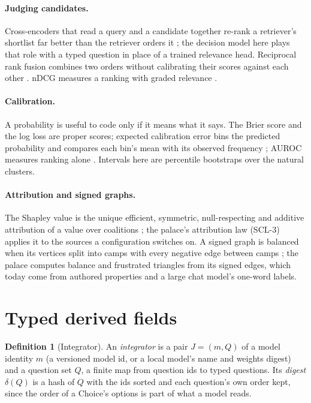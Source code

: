 \documentclass[11pt]{article}
\theoremstyle{definition}
\newtheorem{definition}{Definition}
\theoremstyle{plain}
\theoremstyle{remark}
\begin{document}
\paragraph{Judging candidates.} Cross-encoders that read a query and a candidate together re-rank
a retriever's shortlist far better than the retriever orders it \citep{nogueira2019passage}; the
decision model here plays that role with a typed question in place of a trained relevance head.
Reciprocal rank fusion combines two orders without calibrating their scores against each other
\citep{cormack2009rrf}. nDCG measures a ranking with graded relevance \citep{jarvelin2002cumulated}.

\paragraph{Calibration.} A probability is useful to code only if it means what it says. The Brier
score \citep{brier1950} and the log loss are proper scores; expected calibration error bins the
predicted probability and compares each bin's mean with its observed frequency
\citep{naeini2015ece,guo2017calibration}; AUROC measures ranking alone \citep{hanley1982auc}.
Intervals here are percentile bootstraps \citep{efron1979bootstrap} over the natural clusters.

\paragraph{Attribution and signed graphs.} The Shapley value is the unique efficient, symmetric,
null-respecting and additive attribution of a value over coalitions \citep{shapley1953}; the
palace's attribution law (SCL-3) applies it to the sources a configuration switches on. A signed
graph is balanced when its vertices split into camps with every negative edge between camps
\citep{harary1953balance}; the palace computes balance and frustrated triangles from its signed
edges, which today come from authored properties and a large chat model's one-word labels.

\section{Typed derived fields}\label{sec:layer}
\begin{definition}[Integrator]
An \emph{integrator} is a pair $J = (m, Q)$ of a model identity $m$ (a versioned model id, or a
local model's name and weights digest) and a question set $Q$, a finite map from question ids to
typed questions. Its \emph{digest} $\delta(Q)$ is a hash of $Q$ with the ids sorted and each
question's own order kept, since the order of a Choice's options is part of what a model reads.
\end{definition}
\end{document}
